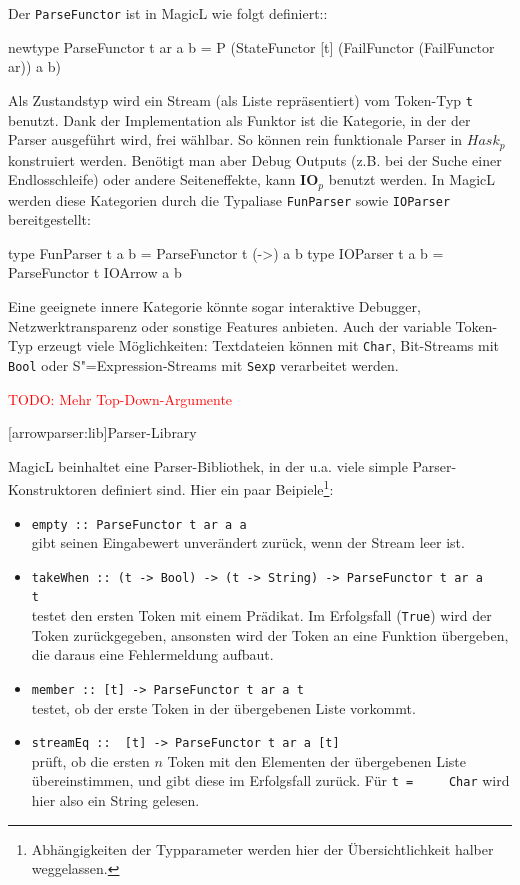 \documentclass[12pt, a4paper, bibgerm]{scrbook}
\newenvironment{DIFnomarkup}{}{}
\newcommand\icode[1]{\lstinline?#1?}
\newcommand{\todo}[1]{
  \textcolor{red}{TODO: #1}
}
\newcommand\lsection{}
\newcommand{\sexp}{S"=Expression}
\begin{document}
Der \icode{ParseFunctor} ist in MagicL wie folgt definiert::
\begin{DIFnomarkup}\begin{code}
newtype ParseFunctor t ar a b =
  P (StateFunctor
     [t]
     (FailFunctor (FailFunctor ar))
     a
     b)
\end{code}\end{DIFnomarkup}
Als Zustandstyp wird ein Stream (als Liste repräsentiert) vom Token-Typ
\icode{t} benutzt.  Dank der Implementation als Funktor ist die
Kategorie, in der der Parser ausgeführt wird, frei wählbar. So können
rein funktionale Parser in $Hask_p$ konstruiert werden. Benötigt man
aber Debug Outputs (z.B. bei der Suche einer Endlosschleife) oder andere
Seiteneffekte, kann $\mathbf{IO}_p$ benutzt werden. In MagicL werden
diese Kategorien durch die Typaliase \icode{FunParser} sowie
\icode{IOParser} bereitgestellt:
\begin{DIFnomarkup}\begin{code}
type FunParser t a b = ParseFunctor t (->) a b
type IOParser  t a b = ParseFunctor t IOArrow a b
\end{code}\end{DIFnomarkup}
Eine geeignete innere Kategorie könnte
sogar interaktive Debugger, Netzwerktransparenz oder sonstige Features
anbieten. Auch der variable Token-Typ erzeugt viele Möglichkeiten:
Textdateien können mit \icode{Char}, Bit-Streams mit \icode{Bool} oder
\sexp{}-Streams mit \icode{Sexp} verarbeitet werden.

\todo{Mehr Top-Down-Argumente}

\lsection[arrowparser:lib]{Parser-Library}

MagicL beinhaltet eine Parser-Bibliothek, in der u.a. viele simple
Parser-Konstruktoren definiert sind. Hier ein paar
Beipiele\footnote{Abhängigkeiten der Typparameter werden hier der
  Übersichtlichkeit halber weggelassen.}:
\begin{itemize}
\item \icode{empty :: ParseFunctor t ar a a}\\
  gibt seinen Eingabewert unverändert zurück, wenn der Stream leer ist.
\item \icode{takeWhen :: (t -> Bool) -> (t -> String) -> ParseFunctor t ar a
    t}\\
  testet den ersten Token mit einem Prädikat. Im Erfolgsfall (\icode{True}) wird der
  Token zurückgegeben, ansonsten wird der Token an eine Funktion
  übergeben, die daraus eine Fehlermeldung aufbaut.
\item \icode{member :: [t] -> ParseFunctor t ar a t}\\
  testet, ob der erste Token in der übergebenen Liste vorkommt.
\item \icode{streamEq ::  [t] -> ParseFunctor t ar a [t]}\\
  prüft, ob die ersten $n$ Token mit den Elementen der übergebenen Liste
  übereinstimmen, und gibt diese im Erfolgsfall zurück. Für \icode{t =
    Char} wird hier also ein String gelesen.
\end{itemize}
\end{document}
